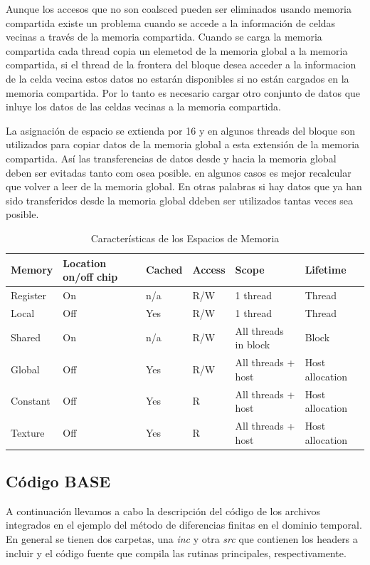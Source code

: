 \documentclass[]{article}
\begin{document}
Aunque los accesos que no son coalsced pueden ser eliminados usando
memoria compartida existe un problema cuando se accede a la información
de celdas vecinas a través de la memoria compartida. Cuando se carga la
memoria compartida cada thread copia un elemetod de la memoria global a
la memoria compartida, si el thread de la frontera del bloque desea
acceder a la informacion de la celda vecina estos datos no estarán
disponibles si no están cargados en la memoria compartida. Por lo tanto
es necesario cargar otro conjunto de datos que inluye los datos de las
celdas vecinas a la memoria compartida.

La asignación de espacio se extienda por 16 y en algunos threads del
bloque son utilizados para copiar datos de la memoria global a esta
extensión de la memoria compartida. Así las transferencias de datos
desde y hacia la memoria global deben ser evitadas tanto com osea
posible. en algunos casos es mejor recalcular que volver a leer de la
memoria global. En otras palabras si hay datos que ya han sido
transferidos desde la memoria global ddeben ser utilizados tantas veces
sea posible.

\begin{table}[htbp]
\centering
\caption{Características de los Espacios de Memoria}
\begin{tabular}{l|l|l|l|l|l}
Memory & Location on/off chip & Cached & Access & Scope & Lifetime \\
\hline
Register & On & n/a & R/W & 1 thread & Thread \\
Local & Off & Yes & R/W & 1 thread & Thread \\
Shared & On & n/a & R/W & All threads in block & Block \\
Global & Off & Yes & R/W & All threads + host & Host allocation \\
Constant & Off & Yes & R & All threads + host & Host allocation \\
Texture & Off & Yes & R & All threads + host & Host allocation
\end{tabular}
\end{table}

\subsection{Código BASE}\label{codigo-base}

A continuación llevamos a cabo la descripción del código de los archivos
integrados en el ejemplo del método de diferencias finitas en el dominio
temporal. En general se tienen dos carpetas, una \emph{inc} y otra
\emph{src} que contienen los headers a incluir y el código fuente que
compila las rutinas principales, respectivamente.
\end{document}
